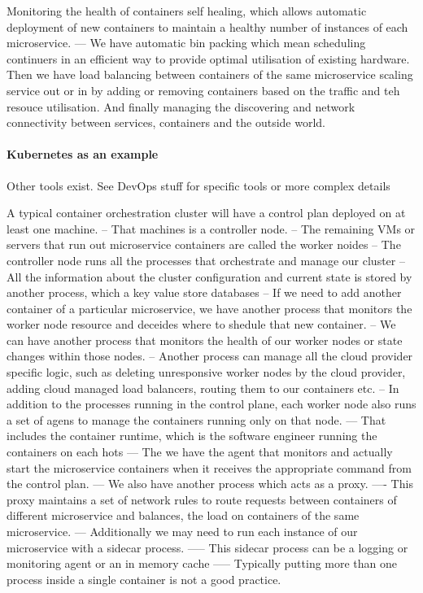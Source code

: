 \documentclass[a4paper, 11pt]{book}
\begin{document}
    Monitoring the health of containers self healing, which allows automatic deployment of new containers to maintain a healthy number of instances of each microservice.
    --- We have automatic bin packing which mean scheduling continuers in an efficient way to provide optimal utilisation of existing hardware.
    Then we have load balancing between containers of the same microservice scaling service out or in by adding or removing containers based on the traffic and teh resouce utilisation.
    And finally managing the discovering and network connectivity between services, containers and the outside world.

    \paragraph{Kubernetes as an example}
    Other tools exist. See DevOps stuff for specific tools or more complex details

    A typical container orchestration cluster will have a control plan deployed on at least one machine.
    -- That machines is a controller node.
    -- The remaining VMs or servers that run out microservice containers are called the worker noides
    -- The controller node runs all the processes that orchestrate and manage our cluster
    -- All the information about the cluster configuration and current state is stored by another process, which a key value store databases
    -- If we need to add another container of a particular microservice, we have another process that monitors the worker node resource and deceides where to shedule that new container.
    -- We can have another process that monitors the health of our worker nodes or state changes within those nodes.
    -- Another process can manage all the cloud provider specific logic, such as deleting unresponsive worker nodes by the cloud provider, adding cloud managed load balancers, routing them to our containers etc.
    -- In addition to the processes running in the control plane, each worker node also runs a set of agens to manage the containers running only on that node.
    --- That includes the container runtime, which is the software engineer running the containers on each hots
    --- The we have the agent that monitors and actually start the microservice containers when it receives the appropriate command from the control plan.
    --- We also have another process which acts as a proxy.
    ---- This proxy maintains a set of network rules to route requests between containers of different microservice and balances, the load on containers of the same microservice.
    --- Additionally we may need to run each instance of our microservice with a sidecar process.
    ----- This sidecar process can be a logging or monitoring agent or an in memory cache
    ----- Typically putting more than one process inside a single container is not a good practice.
\end{document}

